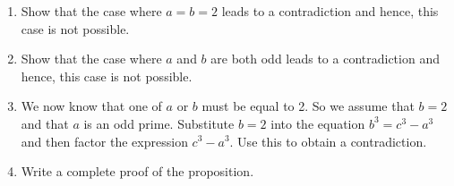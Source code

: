 \begin{enumerate}
\begin{enumerate}
  \item Show that the case where $a = b = 2$ leads to a contradiction and hence, this case is not possible.
  \item Show that the case where $a$ and $b$ are both odd leads to a contradiction and hence, this case is not possible.
  \item We now know that one of $a$ or $b$ must be equal to 2.  So we assume that $b = 2$ and that $a$ is an odd prime.  Substitute $b = 2$ into the equation $b^3 = c^3 - a^3$ and then factor the expression $c^3 - a^3$.  Use this to obtain a contradiction.
  \item Write a complete proof of the proposition.
\end{enumerate}





%


\end{enumerate}
